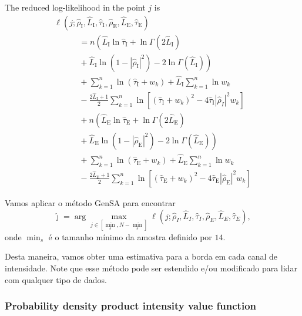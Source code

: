 \documentclass[journal]{IEEEtran}
\begin{document}
The reduced log-likelihood in the point $j$ is
\begin{equation}\label{eq:TotalLogLikelihood}
\begin{array}{l}
\ell(j;\widehat{\rho}_\text{I}, \widehat{L}_\text{I}, \widehat{\tau}_\text{I}, \widehat{\rho}_\text{E}, \widehat{L}_\text{E},\widehat{\tau}_\text{E})\\
{\quad}{\qquad}                         =n\left(\widehat{L}_\text{I}\ln\widehat{\tau}_\text{I} +\ln\Gamma(2\widehat{L}_\text{I})\right.\\
{\quad}{\qquad}                         +\left.\widehat{L}_\text{I}\ln(1-|\widehat{\rho}_\text{I}|^2)-2\ln\Gamma(\widehat{L}_\text{I})\right)\\
{\quad}{\qquad}                         +\sum_{k=1}^{n}\ln(\widehat{\tau}_\text{I}+w_k)+\widehat{L}_\text{I}\sum_{k=1}^{n}\ln w_k\\
{\quad}{\qquad}                 -\frac{2\widehat{L}_\text{I}+1}{2}\sum_{k=1}^{n} \ln\left[(\widehat{\tau}_\text{I}+w_k)^2-4\widehat{\tau}_\text{I}|\widehat{\rho}_{I}|^2w_k\right]\\
{\quad}{\qquad}                         +n\left(\widehat{L}_\text{E}\ln\widehat{\tau}_\text{E}+\ln\Gamma(2\widehat{L}_\text{E})\right.\\
{\quad}{\qquad}                         +\left.\widehat{L}_\text{E}\ln(1-|\widehat{\rho}_\text{E}|^2)-2\ln\Gamma(\widehat{L}_\text{E})\right)\\
{\quad}{\qquad}                         +\sum_{k=1}^{n}\ln(\widehat{\tau}_\text{E}+w_k)+\widehat{L}_\text{E}\sum_{k=1}^{n}\ln w_k\\
{\quad}{\qquad}                         -\frac{2\widehat{L}_\text{E}+1}{2}\sum_{k=1}^{n} \ln\left[(\widehat{\tau}_\text{E}+w_k)^2-4\widehat{\tau}_\text{E}|\widehat{\rho}_\text{E}|^2w_k\right]
\end{array}
\end{equation}

Vamos aplicar o método GenSA para encontrar
$$
\widehat{\jmath}= \arg\max\limits_{j\in [\min_s,N-\min_s]}\ell(j;\widehat{\rho}_I, \widehat{L}_I,\widehat{\tau}_I,\widehat{\rho}_E, \widehat{L}_E, \widehat{\tau}_E),
$$ 
onde $\min_s$ é o tamanho mínimo da amostra definido por $14$.

Desta maneira, vamos obter uma estimativa para a borda em cada canal de intensidade.
Note que esse método pode ser estendido e/ou modificado para lidar com qualquer tipo de dados.

\subsubsection{Probability density product intensity value function}
\end{document}
